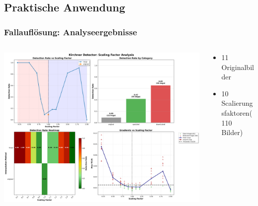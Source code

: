 \documentclass[11pt,t,usepdftitle=false,aspectratio=169]{beamer}
\begin{document}
\subsection{Praktische Anwendung}

\begin{frame}
	\frametitle{Fallauflösung: Analyseergebnisse}
	\begin{columns}[T]
		\begin{column}{0.6\textwidth}
			\includegraphics[width=\textwidth]{images/scaling_analysis_report.png}
		\end{column}
		\begin{column}{0.40\textwidth}
			\begin{itemize}
				\item 11 Originalbilder
				\item 10 Scalierungsfaktoren(110 Bilder)
			\end{itemize}
		\end{column}
	\end{columns}
\end{frame}
\end{document}
